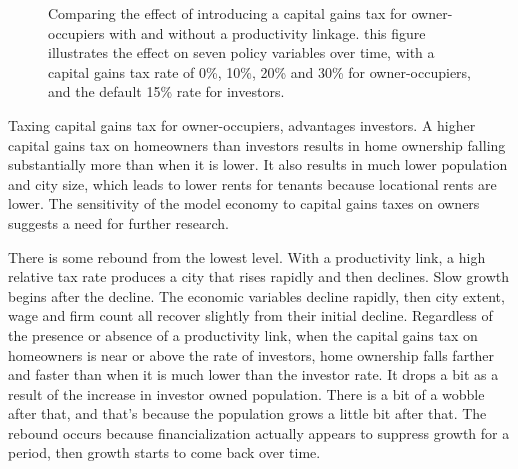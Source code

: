 \begin{figure}[h!tb]
     \caption[Comparing the effect of introducing a capital gains tax for owner-occupiers with and without a productivity linkage]{Comparing the effect of introducing a capital gains tax for owner-occupiers with and without a productivity linkage. this figure illustrates the effect on seven policy variables over time, with a capital gains tax rate of 0\%, 10\%, 20\% and 30\% for owner-occupiers, and the default 15\% rate for investors.}
    \label{fig:CG-pers_link_W-WO-Cost-of-capital}
\end{figure}
Taxing capital gains tax for owner-occupiers, advantages investors. 
A higher capital gains tax on homeowners than investors %
results in home ownership falling substantially more than when it is lower. It also results in much lower population and city size, which leads to lower rents for tenants because locational rents are lower. The sensitivity of the model economy to capital gains taxes on owners suggests a need for further research. 

There is some rebound from the lowest level. 
With a productivity link, a high relative tax rate produces a city that rises rapidly and then declines. Slow growth begins after the decline. The economic variables decline rapidly, %
then city extent, wage and firm count all recover slightly from their initial decline. %
Regardless of the presence or absence of a productivity link, when the capital gains tax on homeowners is near or above the rate of investors, %
home ownership falls farther and faster than when it is much lower than the investor rate. 
It drops a bit as a result of the increase in investor owned population. There is a bit of a wobble after that, and that's because the population grows a little bit after that. The rebound occurs because financialization actually appears to suppress growth for a period, then growth starts to come back over time. 


